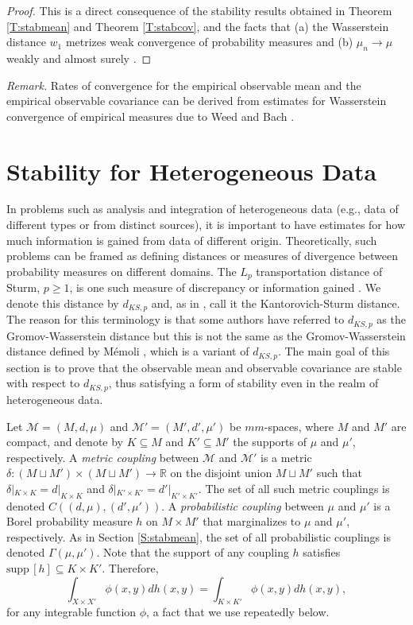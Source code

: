 \documentclass[11pt]{article}
\theoremstyle{definition}
\newcommand{\real}{\ensuremath{\mathbb{R}}}
\newcommand{\dks}{\ensuremath{d_{KS,p}}}
\newcommand{\mm}[1]{\ensuremath{\mathcal{#1}}}
\begin{document}
\begin{proof}
This is a direct consequence of the stability results obtained in Theorem \ref{T:stabmean} and Theorem \ref{T:stabcov}, and the facts that (a) the Wasserstein distance $w_1$ metrizes weak convergence of probability measures  and (b) $\mu_n \to \mu$ weakly and almost surely \cite{dudley2002real}.
\end{proof}

\noindent
{\em Remark.} Rates of convergence for the empirical observable mean and the empirical observable covariance can be derived from estimates for Wasserstein convergence of empirical measures due to Weed and Bach \cite{weed2019}.


\section{Stability for Heterogeneous Data} \label{S:heterogeneous}

In problems such as analysis and integration of heterogeneous data (e.g., data of different types or from distinct sources), it is important to have estimates for how much information is gained from data of different origin. Theoretically, such problems can be framed as defining distances or measures of divergence between probability measures on different domains. The $L_p$ transportation distance of Sturm, $p \geq 1$, is one such measure of discrepancy or information gained \cite{sturm2006}. We denote this distance by $\dks$ and, as in \cite{mioneedham25}, call it the Kantorovich-Sturm distance. The reason for this terminology is that some authors have referred to $\dks$ as the Gromov-Wasserstein distance but this is not the same as the Gromov-Wasserstein distance defined by M\'{e}moli \cite{memoli2011}, which is a variant of $\dks$. The main goal of this section is to prove that the observable mean and observable covariance are stable with respect to $\dks$, thus satisfying a form of stability even in the realm of heterogeneous data.

Let $\mm{M} = (M,d,\mu)$ and $\mm{M}' = (M',d',\mu')$ be $mm$-spaces, where $M$ and $M'$ are compact, and denote by $K \subseteq M$ and $K' \subseteq M'$ the supports of $\mu$ and $\mu'$, respectively. A {\em metric coupling} between $\mm{M}$ and $\mm{M}'$ is a metric $\delta \colon (M \sqcup M') \times (M \sqcup M') \to \real$ on the disjoint union $M \sqcup M'$ such that $\delta|_{K\times K} = d|_{K\times K}$ and  $\delta|_{K' \times K'} = d'|_{K'\times K'}$. The set of all such metric couplings is denoted $C((d,\mu),(d',\mu'))$. A {\em probabilistic coupling} between $\mu$ and $\mu'$ is a Borel probability measure $h$ on $M \times M'$ that marginalizes to $\mu$ and $\mu'$, respectively. As in Section \ref{S:stabmean}, the set of all probabilistic couplings is denoted $\Gamma(\mu,\mu')$. Note that the support of any coupling $h$ satisfies $\text{supp}\,[h] \subseteq K \times K'$. Therefore,
\begin{equation}
\int_{X\times X'} \phi(x,y) dh(x,y) = \int_{K \times K'} \phi(x,y) dh(x,y),
\end{equation}
for any integrable function $\phi$, a fact that we use repeatedly below.
\end{document}
